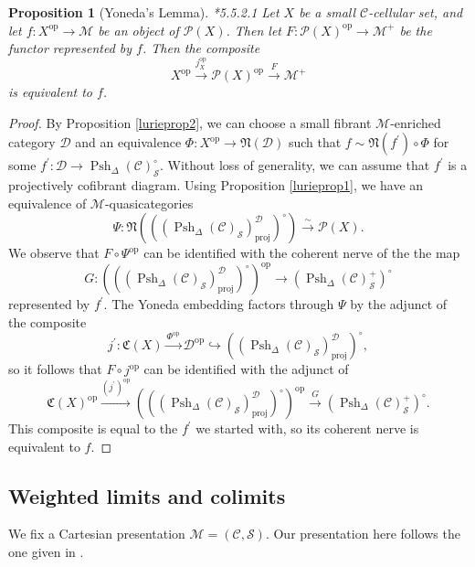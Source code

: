 \documentclass[leqno]{article}
\numberwithin{equation}{subsection}
\theoremstyle{plain}   %
\newtheorem{prop}[equation]{Proposition}
\theoremstyle{remark}
\theoremstyle{plain}
\newcommand{\op}{\ensuremath{\mathrm{op}}}
\renewcommand{\C}{\ensuremath{\mathcal{C}}}
\newcommand{\M}{\ensuremath{\mathcal{M}}}
\newcommand{\Pre}{\ensuremath{\mathcal{P}}}
\newcommand{\setS}{\ensuremath{\mathscr{S}}}
\newcommand{\spsh}{\ensuremath{\operatorname{Psh}_\Delta(\mathcal{C})}}
\begin{document}
\begin{prop}[Yoneda's Lemma]\cite{htt}*{5.5.2.1}
	Let \(X\) be a small \(\C\)-cellular set, and let \(f: X^\op \to \M\) be an object of \(\Pre(X)\).  Then let \(F:\Pre(X)^\op \to \M^+\) be the functor represented by \(f\).  Then the composite \[X^\op\xrightarrow{j^\op_X} \Pre(X)^\op \xrightarrow{F} \M^+\] is equivalent to \(f\).
\end{prop}
\begin{proof}
	By Proposition \ref{lurieprop2}, we can choose a small fibrant \(\M\)-enriched category \(\mathcal{D}\) and an equivalence \(\Phi:X^\op\to \mathfrak{N}(\mathcal{D})\) such that \(f\sim \mathfrak{N}(f^\prime) \circ \Phi\) for some \(f^\prime:\mathcal{D} \to \spsh_\setS^\circ\).  Without loss of generality, we can assume that \(f^\prime\) is a projectively cofibrant diagram.  Using Proposition \ref{lurieprop1}, we have an equivalence of \(\M\)-quasicategories 
	\[\Psi:\mathfrak{N}\left(\left((\spsh_\setS)_\mathrm{proj}^\mathcal{D}\right)^\circ\right) \xrightarrow{\sim} \Pre(X).\] 
	We observe that \(F\circ \Psi^\op\) can be identified with the coherent nerve of the the map 
	\[G: \left(\left((\spsh_\setS)_\mathrm{proj}^\mathcal{D}\right)^\circ\right)^\op \to \left(\spsh^{+}_\setS\right)^\circ\] represented by \(f^\prime\).  The Yoneda embedding factors through \(\Psi\) by the adjunct of the composite 
	\[j^\prime:\mathfrak{C}(X)\xrightarrow{\Phi^\op} \mathcal{D}^\op \hookrightarrow \left((\spsh_\setS)_\mathrm{proj}^\mathcal{D}\right)^\circ,\]
	so it follows that \(F\circ j^\op\) can be identified with the adjunct of 
	\[\mathfrak{C}(X)^\op \xrightarrow{(j^\prime)^\op} \left(\left((\spsh_\setS)_\mathrm{proj}^\mathcal{D}\right)^\circ\right)^\op \xrightarrow{G} \left(\spsh^{+}_\setS\right)^\circ.\]
	This composite is equal to the \(f^\prime\) we started with, so its coherent nerve is equivalent to \(f\).
\end{proof}

\subsection{Weighted limits and colimits}
We fix a Cartesian presentation \(\M=(\C,\setS)\).  Our presentation here follows the one given in \cite{nlabwlim}.
\end{document}
